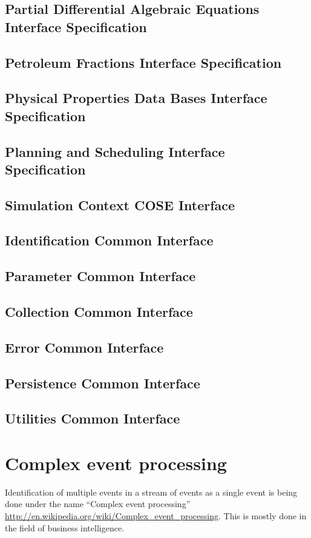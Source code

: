 \subsection{Partial Differential Algebraic Equations Interface Specification}

\subsection{Petroleum Fractions Interface Specification}

\subsection{Physical Properties Data Bases Interface Specification}

\subsection{Planning and Scheduling Interface Specification}

\subsection{Simulation Context COSE Interface}


\subsection{Identification Common Interface}
\subsection{Parameter Common Interface}
\subsection{Collection Common Interface}
\subsection{Error Common Interface}
\subsection{Persistence Common Interface}
\subsection{Utilities Common Interface}

\section{Complex event processing}
Identification of multiple events in a stream of events as a single event is being done under the name ``Complex event processing'' \url{http://en.wikipedia.org/wiki/Complex_event_processing}.  
This is mostly done in the field of business intelligence.  


